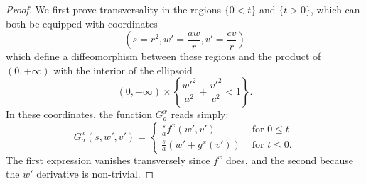 \documentclass[reqno]{amsart}
\renewcommand{\epsilon}{\varepsilon}
\theoremstyle{theorem}
\theoremstyle{remark}
\theoremstyle{definition}
\newcommand{\R}{\mathbf{R}}
\begin{document}
\begin{proof}
We first prove transversality in the regions $\{0 < t\}$ and $\{t > 0\} $, which can both be equipped with coordinates 
\begin{equation} \label{eq:change_coordinates}
    \left(s=r^2,w'=\frac{aw}{r},v'=\frac{cv}{r}\right)
\end{equation}
which define a diffeomorphism between these regions and the product of $(0,+\infty)$ with the interior of the ellipsoid
\begin{equation}
    (0,+\infty)\times \left\{\frac{w'^2}{a^2}+\frac{v'^2}{c^2} < 1\right\}.
\end{equation}
In these coordinates, the function $G^x_a$ reads simply:
\begin{equation} \label{eq:expressing_F_in_half_space}
  G^x_a(s,w',v') =
  \begin{cases}
    \frac{s}{a}f^x(w',v') &   \textrm{ for } 0 \leq t \\
    \frac{s}{a} \left( w' + g^x(v') \right) &  \textrm{ for } t \leq 0 .
  \end{cases}
\end{equation}
The first expression vanishes transversely since $f^x$ does, and the second because the $w'$ derivative is non-trivial.





\end{proof}
\end{document}
